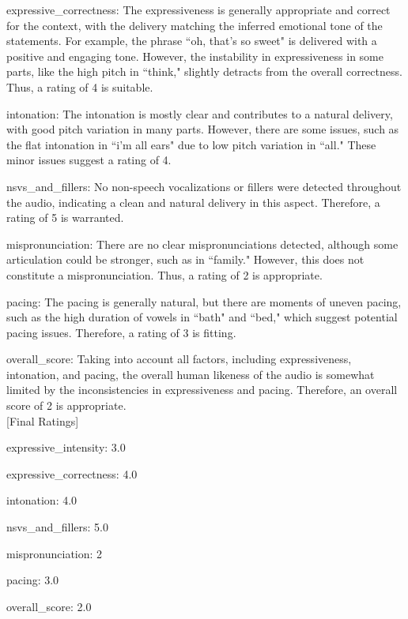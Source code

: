 \begin{tcolorbox}[blue_box, title = {{Audio Sample 1 : Ground-truth Human-likeness Rating = 2.0}}]
expressive\_correctness: The expressiveness is generally appropriate and correct for the context, with the delivery matching the inferred emotional tone of the statements. For example, the phrase ``oh, that's so sweet" is delivered with a positive and engaging tone. However, the instability in expressiveness in some parts, like the high pitch in ``think," slightly detracts from the overall correctness. Thus, a rating of 4 is suitable.


intonation: The intonation is mostly clear and contributes to a natural delivery, with good pitch variation in many parts. However, there are some issues, such as the flat intonation in ``i'm all ears" due to low pitch variation in ``all." These minor issues suggest a rating of 4.


nsvs\_and\_fillers: No non-speech vocalizations or fillers were detected throughout the audio, indicating a clean and natural delivery in this aspect. Therefore, a rating of 5 is warranted.


mispronunciation: There are no clear mispronunciations detected, although some articulation could be stronger, such as in ``family." However, this does not constitute a mispronunciation. Thus, a rating of 2 is appropriate.


pacing: The pacing is generally natural, but there are moments of uneven pacing, such as the high duration of vowels in ``bath" and ``bed," which suggest potential pacing issues. Therefore, a rating of 3 is fitting.


overall\_score: Taking into account all factors, including expressiveness, intonation, and pacing, the overall human likeness of the audio is somewhat limited by the inconsistencies in expressiveness and pacing. Therefore, an overall score of 2 is appropriate. \\


[Final Ratings]

expressive\_intensity: 3.0  

expressive\_correctness: 4.0  

intonation: 4.0  

nsvs\_and\_fillers: 5.0  

mispronunciation: 2  

pacing: 3.0  

overall\_score: 2.0
\end{tcolorbox}




